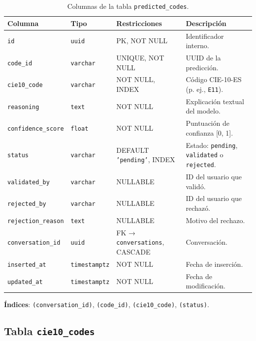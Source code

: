 \begin{table}[h]
\centering
\caption{Columnas de la tabla \texttt{predicted\_codes}.}
\label{tab:predicted-codes}
\begin{tabular}{llp{3.5cm}p{4.5cm}}
\hline
\textbf{Columna} & \textbf{Tipo} & \textbf{Restricciones} & \textbf{Descripción} \\
\hline
\texttt{id}               & \texttt{uuid}    & PK, NOT NULL           & Identificador interno. \\
\texttt{code\_id}         & \texttt{varchar} & UNIQUE, NOT NULL       & UUID de la predicción. \\
\texttt{cie10\_code}      & \texttt{varchar} & NOT NULL, INDEX        & Código CIE-10-ES (p. ej., \texttt{E11}). \\
\texttt{reasoning}        & \texttt{text}    & NOT NULL               & Explicación textual del modelo. \\
\texttt{confidence\_score}& \texttt{float}   & NOT NULL               & Puntuación de confianza [0, 1]. \\
\texttt{status}           & \texttt{varchar} & DEFAULT \texttt{'pending'}, INDEX & Estado: \texttt{pending}, \texttt{validated} o \texttt{rejected}. \\
\texttt{validated\_by}    & \texttt{varchar} & NULLABLE               & ID del usuario que validó. \\
\texttt{rejected\_by}     & \texttt{varchar} & NULLABLE               & ID del usuario que rechazó. \\
\texttt{rejection\_reason}& \texttt{text}    & NULLABLE               & Motivo del rechazo. \\
\texttt{conversation\_id} & \texttt{uuid}    & FK → \texttt{conversations}, CASCADE & Conversación. \\
\texttt{inserted\_at}     & \texttt{timestamptz} & NOT NULL           & Fecha de inserción. \\
\texttt{updated\_at}      & \texttt{timestamptz} & NOT NULL           & Fecha de modificación. \\
\hline
\end{tabular}
\end{table}

\textbf{Índices}: \texttt{(conversation\_id)}, \texttt{(code\_id)}, \texttt{(cie10\_code)}, \texttt{(status)}.

\subsection{Tabla \texttt{cie10\_codes}}

